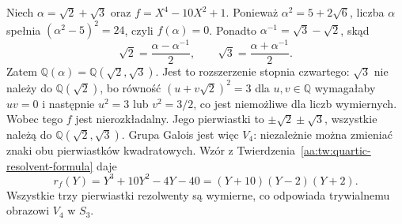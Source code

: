 \begin{przyklad}\label{aa:prz:quartic-klein}
Niech $\alpha=\sqrt2+\sqrt3$ oraz
$f=X^4-10X^2+1$. Ponieważ $\alpha^2=5+2\sqrt6$,
liczba $\alpha$ spełnia $(\alpha^2-5)^2=24$,
czyli $f(\alpha)=0$.
Ponadto $\alpha^{-1}=\sqrt3-\sqrt2$, skąd
\[
 \sqrt2=\frac{\alpha-\alpha^{-1}}2,\qquad
 \sqrt3=\frac{\alpha+\alpha^{-1}}2.
\]
Zatem $\mathbb Q(\alpha)=\mathbb Q(\sqrt2,\sqrt3)$.
Jest to rozszerzenie stopnia czwartego: $\sqrt3$ nie należy
do $\mathbb Q(\sqrt2)$, bo równość
$(u+v\sqrt2)^2=3$ dla $u,v\in\mathbb Q$
wymagałaby $uv=0$ i następnie $u^2=3$ lub $v^2=3/2$,
co jest niemożliwe dla liczb wymiernych.
Wobec tego $f$ jest nierozkładalny.
Jego pierwiastki to $\pm\sqrt2\pm\sqrt3$, wszystkie należą
do $\mathbb Q(\sqrt2,\sqrt3)$. Grupa Galois jest więc $V_4$:
niezależnie można zmieniać znaki obu pierwiastków kwadratowych.
Wzór z Twierdzenia~\ref{aa:tw:quartic-resolvent-formula} daje
\[
 r_f(Y)=Y^3+10Y^2-4Y-40=(Y+10)(Y-2)(Y+2).
\]
Wszystkie trzy pierwiastki rezolwenty są wymierne,
co odpowiada trywialnemu obrazowi $V_4$ w $S_3$.
\end{przyklad}
